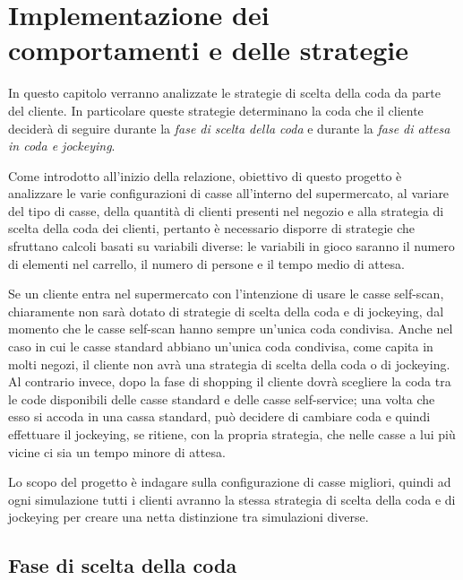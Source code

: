 \chapter{Implementazione dei comportamenti e delle strategie}
\label{implementation:intro}

In questo capitolo verranno analizzate le strategie di scelta della coda da parte del cliente. In particolare queste strategie determinano la coda che il cliente deciderà di seguire durante la \textit{fase di scelta della coda} e durante la \textit{fase di attesa in coda e jockeying}. 

 Come introdotto all'inizio della relazione, obiettivo di questo progetto è analizzare le varie configurazioni di casse all'interno del supermercato, al variare del tipo di casse, della quantità di clienti presenti nel negozio e alla strategia di scelta della coda dei clienti, pertanto è necessario disporre di strategie che sfruttano calcoli basati su variabili diverse: le variabili in gioco saranno il numero di elementi nel carrello, il numero di persone e il tempo medio di attesa.

Se un cliente entra nel supermercato con l'intenzione di usare le casse self-scan, chiaramente non sarà dotato di strategie di scelta della coda e di jockeying, dal momento che le casse self-scan hanno sempre un'unica coda condivisa. Anche nel caso in cui le casse standard abbiano un'unica coda condivisa, come capita in molti negozi, il cliente non avrà una strategia di scelta della coda o di jockeying. Al contrario invece, dopo la fase di shopping il cliente dovrà scegliere la coda tra le code disponibili delle casse standard e delle casse self-service; una volta che esso si accoda in una cassa standard, può decidere di cambiare coda e quindi effettuare il jockeying, se ritiene, con la propria strategia, che nelle casse a lui più vicine ci sia un tempo minore di attesa.

Lo scopo del progetto è indagare sulla configurazione di casse migliori, quindi ad ogni simulazione tutti i clienti avranno la stessa strategia di scelta della coda e di jockeying per creare una netta distinzione tra simulazioni diverse.

\section{Fase di scelta della coda}
\label{implementation:queuechoice}

